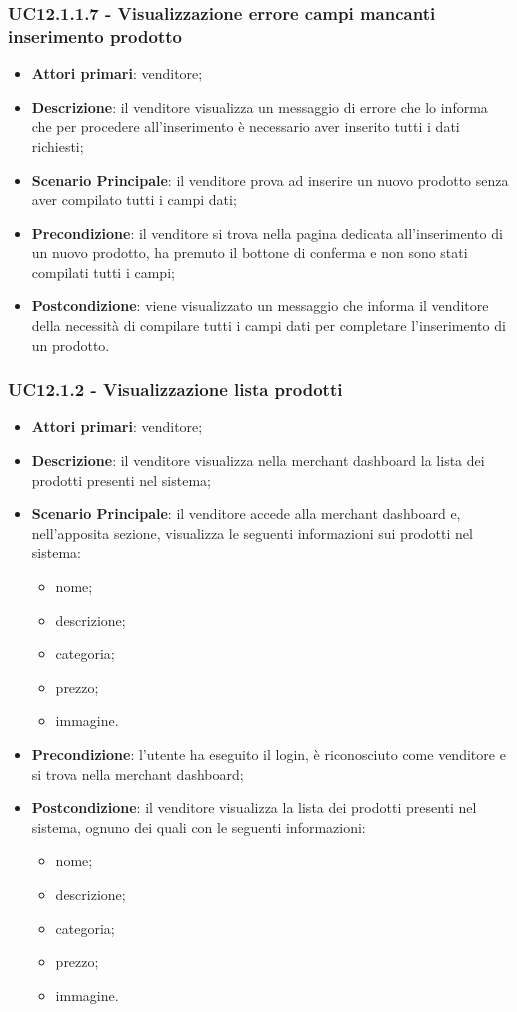 \subsubsection{UC12.1.1.7 - Visualizzazione errore campi mancanti inserimento prodotto}
\begin{itemize}
\item \textbf{Attori primari}: venditore;
\item \textbf{Descrizione}: il venditore visualizza un messaggio di errore che lo informa che per procedere all'inserimento è necessario aver inserito tutti i dati richiesti;
\item \textbf{Scenario Principale}: il venditore prova ad inserire un nuovo prodotto senza aver compilato tutti i campi dati;
\item \textbf{Precondizione}: il venditore si trova nella pagina dedicata all'inserimento di un nuovo prodotto, ha premuto il bottone di conferma e non sono stati compilati tutti i campi;
\item \textbf{Postcondizione}: viene visualizzato un messaggio che informa il venditore della necessità di compilare tutti i campi dati per completare l'inserimento di un prodotto.
\end{itemize}

\subsubsection{UC12.1.2 - Visualizzazione lista prodotti}
\begin{itemize}
\item \textbf{Attori primari}: venditore;
\item \textbf{Descrizione}: il venditore visualizza nella merchant dashboard la lista dei prodotti presenti nel sistema;
\item \textbf{Scenario Principale}: il venditore accede alla merchant dashboard e, nell'apposita sezione, visualizza le seguenti informazioni sui prodotti nel sistema:
\begin{itemize}
\item nome;
\item descrizione;
\item categoria;
\item prezzo;
\item immagine.
\end{itemize}
\item \textbf{Precondizione}: l'utente ha eseguito il login, è riconosciuto come venditore e si trova nella merchant dashboard;
\item \textbf{Postcondizione}: il venditore visualizza la lista dei prodotti presenti nel sistema, ognuno dei quali con le seguenti informazioni:
\begin{itemize}
\item nome;
\item descrizione;
\item categoria;
\item prezzo;
\item immagine.
\end{itemize}
\end{itemize}

